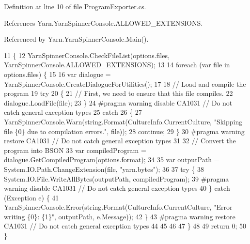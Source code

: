 Definition at line 10 of file Program\-Exporter.\-cs.



References Yarn.\-Yarn\-Spinner\-Console.\-A\-L\-L\-O\-W\-E\-D\-\_\-\-E\-X\-T\-E\-N\-S\-I\-O\-N\-S.



Referenced by Yarn.\-Yarn\-Spinner\-Console.\-Main().


\begin{DoxyCode}
11         \{
12             YarnSpinnerConsole.CheckFileList(options.files, 
      \hyperlink{a00195_a0979de7ea02c8c0375b8220a12e6575e}{YarnSpinnerConsole.ALLOWED\_EXTENSIONS});
13 
14             \textcolor{keywordflow}{foreach} (var file \textcolor{keywordflow}{in} options.files) \{
15 
16                 var dialogue = YarnSpinnerConsole.CreateDialogueForUtilities();
17 
18                 \textcolor{comment}{// Load and compile the program}
19                 \textcolor{keywordflow}{try}
20                 \{
21                     \textcolor{comment}{// First, we need to ensure that this file compiles.}
22                     dialogue.LoadFile(file);
23                 \}
24 \textcolor{preprocessor}{#pragma warning disable CA1031 // Do not catch general exception types}
25 \textcolor{preprocessor}{}                \textcolor{keywordflow}{catch}
26                 \{
27                     YarnSpinnerConsole.Warn(string.Format(CultureInfo.CurrentCulture, \textcolor{stringliteral}{"Skipping file \{0\}
       due to compilation errors."}, file));
28                     \textcolor{keywordflow}{continue};
29                 \}
30 \textcolor{preprocessor}{#pragma warning restore CA1031 // Do not catch general exception types}
31 \textcolor{preprocessor}{}
32                 \textcolor{comment}{// Convert the program into BSON}
33                 var compiledProgram = dialogue.GetCompiledProgram(options.format);
34 
35                 var outputPath = System.IO.Path.ChangeExtension(file, \textcolor{stringliteral}{"yarn.bytes"});
36 
37                 \textcolor{keywordflow}{try} \{
38                     System.IO.File.WriteAllBytes(outputPath, compiledProgram);
39 \textcolor{preprocessor}{#pragma warning disable CA1031 // Do not catch general exception types}
40 \textcolor{preprocessor}{}                \} \textcolor{keywordflow}{catch} (Exception e) \{
41                     YarnSpinnerConsole.Error(string.Format(CultureInfo.CurrentCulture, \textcolor{stringliteral}{"Error writing \{0\}:
       \{1\}"}, outputPath, e.Message));
42                 \}
43 \textcolor{preprocessor}{#pragma warning restore CA1031 // Do not catch general exception types}
44 \textcolor{preprocessor}{}
45 
46 
47             \}
48 
49             \textcolor{keywordflow}{return} 0;
50         \}
\end{DoxyCode}


